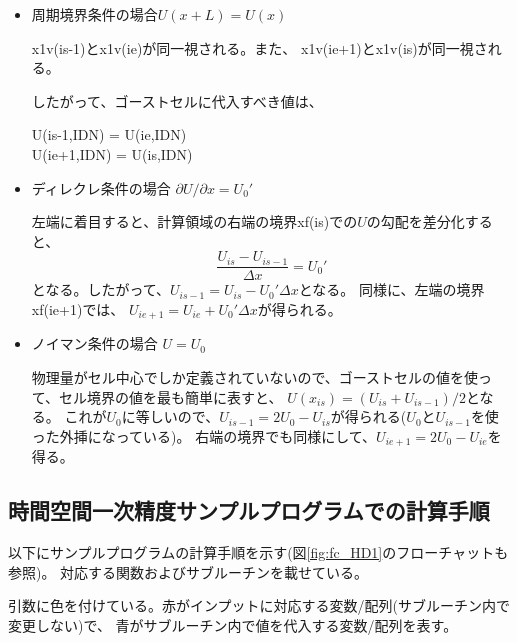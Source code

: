 \begin{itemize}
    \item 周期境界条件の場合$U(x+L)=U(x)$

        {\ttfamily x1v(is-1)}と{\ttfamily x1v(ie)}が同一視される。また、
        {\ttfamily x1v(ie+1)}と{\ttfamily x1v(is)}が同一視される。

        したがって、ゴーストセルに代入すべき値は、
        \begin{screen}
                {\ttfamily U(is-1,IDN) = U(ie,IDN)} \\
                {\ttfamily U(ie+1,IDN) = U(is,IDN)}
        \end{screen}

    \item ディレクレ条件の場合 $\partial U/\partial x =U_0'$

        左端に着目すると、計算領域の右端の境界{\ttfamily xf(is)}での$U$の勾配を差分化すると、
        \begin{equation}
            \frac{U_{is} - U_{is-1}}{\Delta x} = U_0'
        \end{equation}
    となる。したがって、$U_{is-1} = U_{is} - U_0' \Delta x$となる。
    同様に、左端の境界{\ttfamily xf(ie+1)}では、
    $U_{ie+1} = U_{ie} + U_0' \Delta x$が得られる。

    \item ノイマン条件の場合 $U=U_0$

        物理量がセル中心でしか定義されていないので、ゴーストセルの値を使って、セル境界の値を最も簡単に表すと、
        $U(x_{is})= (U_{is} + U_{is-1})/2$となる。
        これが$U_0$に等しいので、$U_{is-1} = 2U_0 - U_{is}$が得られる($U_0$と$U_{is-1}$を使った外挿になっている)。
        右端の境界でも同様にして、$U_{ie+1} = 2U_0 - U_{ie}$を得る。

\end{itemize}

\subsection{時間空間一次精度サンプルプログラムでの計算手順}

以下にサンプルプログラムの計算手順を示す(図\ref{fig:fc_HD1}のフローチャットも参照)。
対応する関数およびサブルーチンを載せている。

引数に色を付けている。赤がインプットに対応する変数/配列(サブルーチン内で変更しない)で、
青がサブルーチン内で値を代入する変数/配列を表す。


